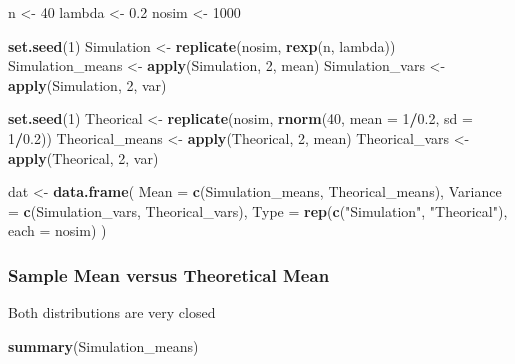 \documentclass[]{article}
\newenvironment{Shaded}{\begin{snugshade}}{\end{snugshade}}
\newcommand{\KeywordTok}[1]{\textcolor[rgb]{0.13,0.29,0.53}{\textbf{#1}}}
\newcommand{\DataTypeTok}[1]{\textcolor[rgb]{0.13,0.29,0.53}{#1}}
\newcommand{\DecValTok}[1]{\textcolor[rgb]{0.00,0.00,0.81}{#1}}
\newcommand{\FloatTok}[1]{\textcolor[rgb]{0.00,0.00,0.81}{#1}}
\newcommand{\StringTok}[1]{\textcolor[rgb]{0.31,0.60,0.02}{#1}}
\newcommand{\OperatorTok}[1]{\textcolor[rgb]{0.81,0.36,0.00}{\textbf{#1}}}
\newcommand{\NormalTok}[1]{#1}
\begin{document}
\begin{Shaded}
\begin{Highlighting}[]
\NormalTok{n <-}\StringTok{ }\DecValTok{40}
\NormalTok{lambda <-}\StringTok{ }\FloatTok{0.2}
\NormalTok{nosim <-}\StringTok{ }\DecValTok{1000}

\KeywordTok{set.seed}\NormalTok{(}\DecValTok{1}\NormalTok{)}
\NormalTok{Simulation <-}\StringTok{ }\KeywordTok{replicate}\NormalTok{(nosim, }\KeywordTok{rexp}\NormalTok{(n, lambda))}
\NormalTok{Simulation_means <-}\StringTok{ }\KeywordTok{apply}\NormalTok{(Simulation, }\DecValTok{2}\NormalTok{, mean)}
\NormalTok{Simulation_vars <-}\StringTok{ }\KeywordTok{apply}\NormalTok{(Simulation, }\DecValTok{2}\NormalTok{, var)}

\KeywordTok{set.seed}\NormalTok{(}\DecValTok{1}\NormalTok{)}
\NormalTok{Theorical <-}\StringTok{ }\KeywordTok{replicate}\NormalTok{(nosim, }\KeywordTok{rnorm}\NormalTok{(}\DecValTok{40}\NormalTok{, }\DataTypeTok{mean =} \DecValTok{1}\OperatorTok{/}\FloatTok{0.2}\NormalTok{, }\DataTypeTok{sd =} \DecValTok{1}\OperatorTok{/}\FloatTok{0.2}\NormalTok{))}
\NormalTok{Theorical_means <-}\StringTok{ }\KeywordTok{apply}\NormalTok{(Theorical, }\DecValTok{2}\NormalTok{, mean)}
\NormalTok{Theorical_vars <-}\StringTok{ }\KeywordTok{apply}\NormalTok{(Theorical, }\DecValTok{2}\NormalTok{, var)}

\NormalTok{dat <-}\StringTok{ }\KeywordTok{data.frame}\NormalTok{(}
      \DataTypeTok{Mean =} \KeywordTok{c}\NormalTok{(Simulation_means, Theorical_means),}
      \DataTypeTok{Variance =} \KeywordTok{c}\NormalTok{(Simulation_vars, Theorical_vars),}
      \DataTypeTok{Type =} \KeywordTok{rep}\NormalTok{(}\KeywordTok{c}\NormalTok{(}\StringTok{"Simulation"}\NormalTok{, }\StringTok{"Theorical"}\NormalTok{), }\DataTypeTok{each =}\NormalTok{ nosim)}
\NormalTok{    )}
\end{Highlighting}
\end{Shaded}

\subsubsection{Sample Mean versus Theoretical
Mean}\label{sample-mean-versus-theoretical-mean}

Both distributions are very closed

\begin{Shaded}
\begin{Highlighting}[]
\KeywordTok{summary}\NormalTok{(Simulation_means)}
\end{Highlighting}
\end{Shaded}
\end{document}
